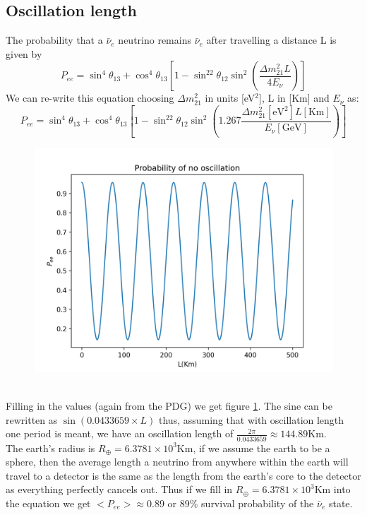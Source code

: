 \documentclass[10pt,a4paper,twoside]{article}
\begin{document}
\subsection{Oscillation length}
The probability that a $\bar{\nu}_e$ neutrino remains $\bar{\nu}_e$ after travelling a distance L is given by
\begin{equation}
	P_{ee} = \sin^4\theta_{13} + \cos^4\theta_{13}\left[1-\sin^22\theta_{12}\sin^2\left(\frac{\Delta m_{21}^2L}{4E_\nu}\right)\right]
\end{equation}
We can re-write this equation choosing $\Delta m_{21}^2$ in units [eV$^2$], L in [Km] and $E_{\nu}$ as:
\begin{equation}
P_{ee} = \sin^4\theta_{13} + \cos^4\theta_{13}\left[1-\sin^22\theta_{12}\sin^2\left(1.267\frac{\Delta m_{21}^2[\text{eV}^2]L[\text{Km}]}{E_\nu[\text{GeV}]}\right)\right]
\end{equation}
\begin{figure}
	\centering
	\includegraphics[width=0.7\linewidth]{no_oscillation.png}
	\caption{}
	\label{nooscillation}
\end{figure}\\
Filling in the values (again from the PDG) we get figure \ref{nooscillation}. The sine can be rewritten as $\sin(0.0433659\times L)$ thus, assuming that with oscillation length one period is meant, we have an oscillation length of $\frac{2\pi}{0.0433659} \approx 144.89$Km.\\
The earth's radius is $R_{\oplus} = 6.3781\times10^3$Km, if we assume the earth to be a sphere, then the average length a neutrino from anywhere within the earth will travel to a detector is the same as the length from the earth's core to the detector as everything perfectly cancels out. Thus if we fill in $R_{\oplus} = 6.3781\times10^3$Km into the equation we get $<P_{ee}> \approx 0.89$ or $89\%$ survival probability of the $\bar{\nu}_e$ state.
\end{document}
